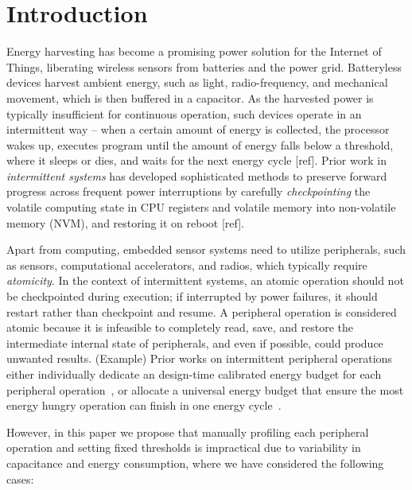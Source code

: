 \section{Introduction}


Energy harvesting has become a promising power solution for the Internet of Things, liberating wireless sensors from batteries and the power grid. 
Batteryless devices harvest ambient energy, such as light, radio-frequency, and mechanical movement, which is then buffered in a capacitor. 
As the harvested power is typically insufficient for continuous operation, such devices operate in an intermittent way -- when a certain amount of energy is collected, the processor wakes up, executes program until the amount of energy falls below a threshold, where it sleeps or dies, and waits for the next energy cycle [ref]. 
Prior work in \textit{intermittent systems} has developed sophisticated methods to preserve forward progress across frequent power interruptions by carefully \textit{checkpointing} the volatile computing state in CPU registers and volatile memory into non-volatile memory (NVM), and restoring it on reboot [ref]. 



Apart from computing, embedded sensor systems need to utilize peripherals, such as sensors, computational accelerators, and radios, which typically require \textit{atomicity}.
In the context of intermittent systems, an atomic operation should not be checkpointed during execution; if interrupted by power failures, it should restart rather than checkpoint and resume.
A peripheral operation is considered atomic because it is infeasible to completely read, save, and restore the intermediate internal state of peripherals, and even if possible, could produce unwanted results. 
(Example)
Prior works on intermittent peripheral operations either individually dedicate an  design-time calibrated energy budget for each peripheral operation~\cite{gomez2016dynamic}, or allocate a universal energy budget that ensure the most energy hungry operation can finish in one energy cycle~\cite{maeng2019supporting}.




However, in this paper we propose that manually profiling each peripheral operation and setting fixed thresholds is impractical due to variability in capacitance and energy consumption, where we have considered the following cases: 

